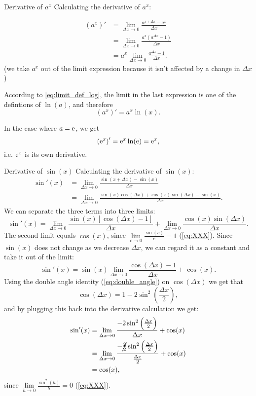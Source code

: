 \begin{example}{Derivative of $a^{x}$}{}
  Calculating the derivative of $a^{x}$:

  \begin{align*}
    \left(a^{x}\right)' &= \lim\limits_{\Delta x\to 0}\frac{a^{x+\Delta x}-a^{x}}{\Delta x}\\
                        &= \lim\limits_{\Delta x\to 0}\frac{a^{x}(a^{\Delta x}-1)}{\Delta x}\\
                        &= a^{x}\lim\limits_{\Delta x\to 0}\frac{a^{\Delta x}-1}{\Delta x}.
  \end{align*}
  (we take $a^{x}$ out of the limit expression because it isn't affected by a change in $\Delta x$)

  According to \autoref{eq:limit_def_log}, the limit in the last expression is one of the defintions of $\ln(a)$, and therefore
  \[
    \left(a^{x}\right)' = a^{x}\ln(x).
  \]

  In the case where $a=\mathrm{e}$, we get
  \[
    \left(\mathrm{e}^{x}\right)' = \mathrm{e}^{x}\ln(\mathrm{e}) = \mathrm{e}^{x},
  \]
  i.e. $\mathrm{e}^{x}$ is its own derivative.
\end{example}

\begin{example}{Derivative of $\sin(x)$}{}
  Calculating the derivative of $\sin(x)$:
  \begin{align*}
    \sin'(x) &= \lim\limits_{\Delta x\to 0}\frac{\sin\left(x+\Delta x\right)-\sin(x)}{\Delta x}\\
             &= \lim\limits_{\Delta x\to 0}\frac{\sin(x)\cos\left(\Delta x\right)+\cos(x)\sin\left(\Delta x\right)-\sin(x)}{\Delta x}.
  \end{align*}
  We can separate the three terms into three limits:
  \[
    \sin'(x) = \lim\limits_{\Delta x\to 0}\frac{\sin(x)\left[\cos\left(\Delta x\right)-1\right]}{\Delta x} + \lim\limits_{\Delta x\to 0}\frac{\cos(x)\sin\left(\Delta x\right)}{\Delta x}.
  \]
  The second limit equals $\cos(x)$, since $\lim\limits_{c\to 0}\frac{\sin(c)}{c}=1$ (\autoref{eq:XXX}). Since $\sin(x)$ does not change as we decrease $\Delta x$, we can regard it as a constant and take it out of the limit:
  \[
    \sin'(x) = \sin(x)\lim\limits_{\Delta x\to 0}\frac{\cos\left(\Delta x\right)-1}{\Delta x} + \cos(x).
  \]
  Using the double angle identity (\autoref{eq:double_angle}) on $\cos\left(\Delta x\right)$ we get that
  \[
    \cos\left(\Delta x\right) = 1-2\sin^{2}\left(\frac{\Delta x}{2}\right),
  \]
  and by plugging this back into the derivative calculation we get:
  \begin{align*}
    \sin'(x) &= \lim\limits_{\Delta x\to 0}\frac{-2\sin^{2}\left(\frac{\Delta x}{2}\right)}{\Delta x} + \cos(x)\\
             &= \lim\limits_{\Delta x\to 0}\frac{-\cancel{\frac{2}{2}}\sin^{2}\left(\frac{\Delta x}{2}\right)}{\frac{\Delta x}{2}} + \cos(x)\\
             &= \cos(x),
  \end{align*}
  since $\lim\limits_{h\to0}\frac{\sin^{2}(h)}{h}=0$ (\autoref{eq:XXX}).

\end{example}

